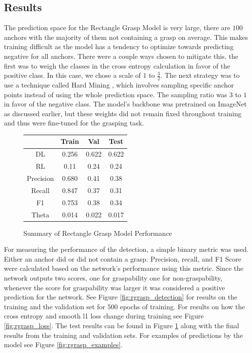 \documentclass{article}
\begin{document}
\subsection{Results}
The prediction space for the Rectangle Grasp Model is very large, there are
$100$ anchors with the majority of them not containing a grasp on average.
This makes training difficult as the model has a tendency to optimize
towards predicting negative for all anchors. There were a couple ways chosen
to mitigate this, the first was to weigh the classes in the cross entropy
calculation in favor of the positive class. In this case, we chose a scale of $1$ to
$\frac{3}{2}$. The next strategy was to use a technique called Hard Mining
\cite{liu15}, which involves sampling specific anchor points instead of
using the whole prediction space. The sampling ratio was $3$ to $1$ in favor of the
negative class. The model's backbone was pretrained on ImageNet as discussed
earlier, but these weights did not remain fixed throughout training and thus
were fine-tuned for the grasping task.

\begin{figure}
\centering
\begin{tabular}{|c | c | c | c|}
\hline
&Train&Val&Test\\
\hline
DL&0.256&0.622&0.622\\
\hline
RL&0.11&0.24&0.24\\
\hline
Precision&0.680&0.41&0.38\\
\hline
Recall&0.847&0.37&0.31\\
\hline
F1&0.753&0.38&0.34\\
\hline
Theta&0.014&0.022&0.017\\
\hline
\end{tabular}
\caption{Summary of Rectangle Grasp Model Performance}
\label{fig:test_results}
\end{figure}

For measuring the performance of the detection, a simple binary metric was
used. Either an anchor did or did not contain a grasp. Precision, recall,
and F1 Score were calculated based on the network's performance using this
metric. Since the network outputs two scores, one for graspability one for
non-graspability, whenever the score for graspability was larger it was
considered a positive prediction for the network. See Figure
\ref{fig:rgrasp_detection} for results on the training and the validation
set for $500$ epochs of training. For results on how the cross entropy
and smooth l1 loss change during training see Figure \ref{fig:rgrasp_loss}.
The test results can be found in Figure \ref{fig:test_results} along with
the final results from the training and validation sets. For examples
of predictions by the model see Figure \ref{fig:rgrasp_examples}.
\end{document}
